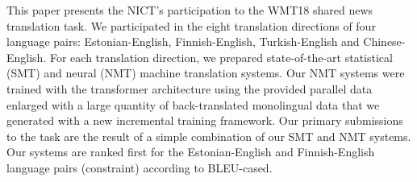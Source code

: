 This paper presents the NICT's participation to the WMT18 shared news translation task. We participated in the eight translation directions of four language pairs: Estonian-English, Finnish-English, Turkish-English and Chinese-English. For each translation direction, we prepared state-of-the-art statistical (SMT) and neural (NMT) machine translation systems. Our NMT systems were trained with the transformer architecture using the provided parallel data enlarged with a large quantity of back-translated monolingual data that we generated with a new incremental training framework. Our primary submissions to the task are the result of a simple combination of our SMT and NMT systems. Our systems are ranked first for the Estonian-English and Finnish-English language pairs (constraint) according to BLEU-cased.
